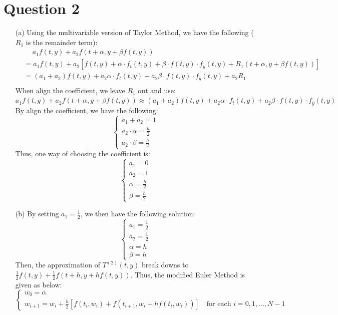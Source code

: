 \documentclass[11pt]{article}
\begin{document}
\section*{Question 2}
\begin{itemize}
	\item [(a)]
	Using the multivariable version of Taylor Method, we have the following ($ R_1$ is the remainder term): 
	\begin{equation*}
	\begin{aligned}
	&\quad\ a_1f(t,y) + a_2f(t+\alpha, y + \beta f(t,y))\\ 
	&= a_1 f(t,y) + a_2[f(t,y) + \alpha\cdot f_t(t,y) + \beta\cdot f(t,y) \cdot f_y(t,y) + R_1(t+\alpha, y + \beta f(t,y)) ]\\
	&= (a_1+a_2)f(t,y) + a_2\alpha \cdot f_t(t,y) + a_2\beta\cdot f(t,y) \cdot f_y(t,y) + a_2R_1\\
	\end{aligned}
	\end{equation*}
	When align the coefficient, we leave $ R_1 $ out and use:\\ $  a_1f(t,y) + a_2f(t+\alpha, y + \beta f(t,y)) \approx (a_1+a_2)f(t,y) + a_2\alpha \cdot f_t(t,y) + a_2\beta\cdot f(t,y) \cdot f_y(t,y) $\\
	By align the coefficient, we have the following:
	\[ \begin{cases}
	a_1+a_2 = 1\\
	a_2\cdot \alpha = \frac{h}{2}\\
	a_2\cdot \beta = \frac{h}{2}
	\end{cases} \]
	Thus, one way of choosing the coefficient is:
	\[ \begin{cases}
	a_1 = 0\\
	a_2 = 1\\
	\alpha = \frac{h}{2}\\
	\beta = \frac{h}{2}
	\end{cases} \]
	
	\item [(b)]
	By setting $ a_1 = \frac{1}{2} $, we then have the following solution:
	\[ \begin{cases}
	a_1 = \frac{1}{2}\\
	a_2 = \frac{1}{2}\\
	\alpha = h\\
	\beta = h
	\end{cases} \]
	Then, the approximation of $ T^{(2)}(t,y) $ break downs to $ \frac{1}{2}f(t,y) + \frac{1}{2}f(t+h,y+hf(t,y)) $. Thus, the modified Euler Method is given as below:
	\[ \begin{cases}
	w_0 = \alpha\\
	w_{i+1} = w_i + \frac{h}{2}[f(t_i,w_i) + f(t_{i+1},w_i+hf(t_i,w_i))]\quad\text{for each } i = 0,1,...,N-1
	\end{cases} \]\pagebreak
	

\end{itemize}
\end{document}
